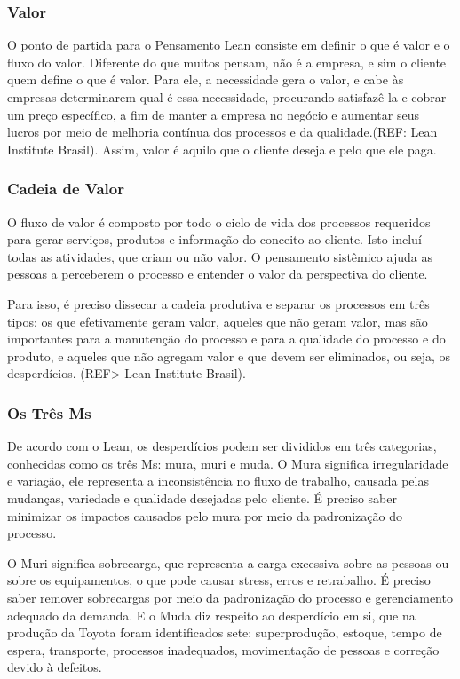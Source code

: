 \subsubsection[Valor]{Valor}

O ponto de partida para o Pensamento Lean consiste em definir o que é valor e o fluxo do valor. Diferente do que muitos pensam, não é a empresa, e sim o cliente quem define o que é valor. Para ele, a necessidade gera o valor, e cabe às empresas determinarem qual é essa necessidade, procurando satisfazê-la e cobrar um preço específico, a fim de manter a empresa no negócio e aumentar seus lucros por meio de melhoria contínua dos processos e da qualidade.(REF: Lean Institute Brasil). Assim, valor é aquilo que o cliente deseja e pelo que ele paga. 

\subsubsection[Cadeia de Valor]{Cadeia de Valor}

O fluxo de valor é composto por todo o ciclo de vida dos processos requeridos para gerar serviços, produtos e informação do conceito ao cliente.  Isto incluí todas as atividades, que criam ou não valor. O pensamento sistêmico ajuda as pessoas a perceberem o processo e entender o valor da perspectiva do cliente. 

Para isso, é preciso dissecar a cadeia produtiva e separar os processos em três tipos: os que efetivamente geram valor, aqueles que não geram valor, mas são importantes para a manutenção do processo e para a qualidade do processo e do produto, e aqueles que não agregam valor e que devem ser eliminados, ou seja, os desperdícios. (REF> Lean Institute Brasil).

\subsubsection[Os Três Ms]{Os Três Ms}

De acordo com o Lean, os desperdícios podem ser divididos em três categorias, conhecidas como os três Ms: mura, muri e muda. O Mura significa irregularidade e variação, ele representa a inconsistência no fluxo de trabalho, causada pelas mudanças, variedade e qualidade desejadas pelo cliente. É preciso saber minimizar os impactos causados pelo mura por meio da padronização do processo. 

O Muri significa sobrecarga, que representa a carga excessiva sobre as pessoas ou sobre os equipamentos, o que pode causar stress, erros e retrabalho. É preciso saber remover sobrecargas por meio da padronização do processo e gerenciamento adequado da demanda. E o Muda diz respeito ao desperdício em si, que na produção da Toyota foram identificados sete: superprodução, estoque, tempo de espera, transporte, processos inadequados, movimentação de pessoas e correção devido à defeitos.

